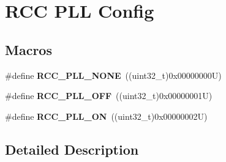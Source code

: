 \hypertarget{group___r_c_c___p_l_l___config}{}\section{R\+CC P\+LL Config}
\label{group___r_c_c___p_l_l___config}
\subsection*{Macros}
\begin{DoxyCompactItemize}
\item 
\mbox{\label{group___r_c_c___p_l_l___config_gae47a612f8e15c32917ee2181362d88f3}} 
\#define {\bfseries R\+C\+C\+\_\+\+P\+L\+L\+\_\+\+N\+O\+NE}~((uint32\+\_\+t)0x00000000\+U)
\item 
\mbox{\label{group___r_c_c___p_l_l___config_ga3a8d5c8bcb101c6ca1a574729acfa903}} 
\#define {\bfseries R\+C\+C\+\_\+\+P\+L\+L\+\_\+\+O\+FF}~((uint32\+\_\+t)0x00000001\+U)
\item 
\mbox{\label{group___r_c_c___p_l_l___config_gaf86dbee130304ba5760818f56d34ec91}} 
\#define {\bfseries R\+C\+C\+\_\+\+P\+L\+L\+\_\+\+ON}~((uint32\+\_\+t)0x00000002\+U)
\end{DoxyCompactItemize}


\subsection{Detailed Description}
